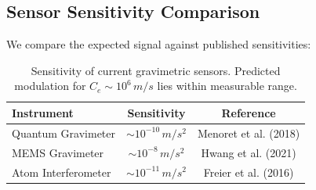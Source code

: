     \subsection*{Sensor Sensitivity Comparison}
    We compare the expected signal against published sensitivities:

    \begin{table}[h!]
        \centering
        \begin{tabular}{|l|c|c|}
            \hline
            \textbf{Instrument} & \textbf{Sensitivity} & \textbf{Reference} \\
            \hline
            Quantum Gravimeter & \( \sim 10^{-10} \, \si{m/s^2} \) & Menoret et al. (2018) \\
            MEMS Gravimeter & \( \sim 10^{-8} \, \si{m/s^2} \) & Hwang et al. (2021) \\
            Atom Interferometer & \( \sim 10^{-11} \, \si{m/s^2} \) & Freier et al. (2016) \\
            \hline
        \end{tabular}
        \caption{Sensitivity of current gravimetric sensors. Predicted modulation for \( C_e \sim 10^6\, \si{m/s} \) lies within measurable range.}
    \end{table}


%
%
%
%
